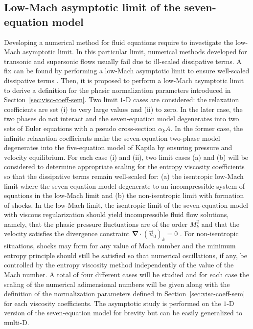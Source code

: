 \documentclass[preprint,10pt]{elsarticle}
\renewcommand{\div}{\mbold{\nabla}\! \cdot \!}
\newcommand{\mbold}[1]{\boldsymbol#1}
\newcommand{\sct}[1]{Section~\ref{#1}}                   %
\begin{document}
\subsection{Low-Mach asymptotic limit of the seven-equation model}\label{sec:low-Mach-sem}
Developing a numerical method for fluid equations require to investigate the low-Mach asymptotic limit. In this particular limit, numerical methods developed for transonic and supersonic flows usually fail due to ill-scaled dissipative terms. A fix can be found by performing a low-Mach asymptotic limit to ensure well-scaled dissipative terms \cite{LowMach1, LowMach2, LowMach3}. Then, it is proposed to perform a low-Mach asymptotic limit to derive a definition for the phasic normalization parameters introduced in \sct{sec:visc-coeff-sem}. Two limit $1$-D cases are considered: the relaxation coefficients are set (i) to very large values and (ii) to zero. In the later case, the two phases do not interact and the seven-equation model degenerates into two sets of Euler equations with a pseudo cross-section $\alpha_k A$. In the former case, the infinite relaxation coefficients make the seven-equation two-phase model degenerates into the five-equation model of Kapila by ensuring pressure and velocity equilibrium. For each case (i) and (ii), two limit cases (a) and (b) will be considered to determine appropriate scaling for the entropy 
viscosity coefficients so that the dissipative terms remain well-scaled for: 
(a) the isentropic low-Mach limit where the seven-equation model degenerate to an incompressible system of 
equations in the low-Mach limit and 
(b) the non-isentropic limit with formation of shocks. 
In the low-Mach limit, the isentropic limit of the seven-equation model with viscous regularization should yield incompressible 
fluid flow solutions, namely, that the phasic pressure fluctuations are of the 
order $M^2_k$ and that the velocity satisfies the divergence constraint $\div ( \vec{u}_0 )_k = 0$ 
\cite{LowMach1, LowMach2, LowMach3}. For non-isentropic situations, shocks may form for any 
value of Mach number and the minimum entropy principle should still be satisfied so that numerical 
oscillations, if any, be controlled by the entropy viscosity method independently of the value of the Mach number. A total of four different cases will be studied and for each case the scaling of the numerical adimensional numbers will be given along with the definition of the normalization parameters defined in \sct{sec:visc-coeff-sem} for each viscosity coefficients. The asymptotic study is performed on the $1$-D version of the seven-equation model for brevity but can be easily generalized to multi-D.
\end{document}
